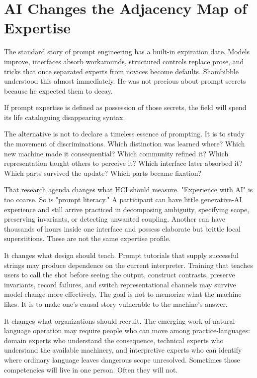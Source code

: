 \documentclass[11pt]{article}
\begin{document}
\section{AI Changes the Adjacency Map of Expertise}

The standard story of prompt engineering has a built-in expiration date. Models improve, interfaces absorb workarounds, structured controls replace prose, and tricks that once separated experts from novices become defaults. Shambibble understood this almost immediately. He was not precious about prompt secrets because he expected them to decay.

If prompt expertise is defined as possession of those secrets, the field will spend its life cataloguing disappearing syntax.

The alternative is not to declare a timeless essence of prompting. It is to study the movement of discriminations. Which distinction was learned where? Which new machine made it consequential? Which community refined it? Which representation taught others to perceive it? Which interface later absorbed it? Which parts survived the update? Which parts became fixation?

That research agenda changes what HCI should measure. "Experience with AI" is too coarse. So is "prompt literacy." A participant can have little generative-AI experience and still arrive practiced in decomposing ambiguity, specifying scope, preserving invariants, or detecting unwanted coupling. Another can have thousands of hours inside one interface and possess elaborate but brittle local superstitions. These are not the same expertise profile.

It changes what design should teach. Prompt tutorials that supply successful strings may produce dependence on the current interpreter. Training that teaches users to call the shot before seeing the output, construct contrasts, preserve invariants, record failures, and switch representational channels may survive model change more effectively. The goal is not to memorize what the machine likes. It is to make one's causal story vulnerable to the machine's answer.

It changes what organizations should recruit. The emerging work of natural-language operation may require people who can move among practice-languages: domain experts who understand the consequence, technical experts who understand the available machinery, and interpretive experts who can identify where ordinary language leaves dangerous scope unresolved. Sometimes those competencies will live in one person. Often they will not.
\end{document}
